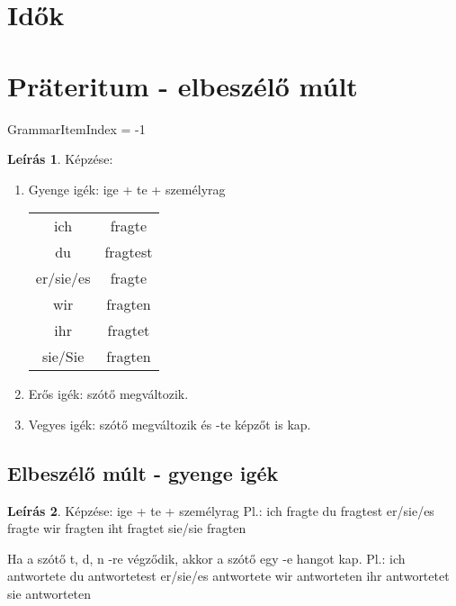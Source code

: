 \documentclass{article}
\theoremstyle{definition}
\newtheorem*{desc}{Leírás}
\begin{document}
\section{Idők}

\section{Präteritum - elbeszélő múlt}

GrammarItemIndex = -1

\begin{desc}
Képzése:
\begin{enumerate}
\item
Gyenge igék: ige + te + személyrag

\begin{tabular}{cc}
 ich & fragte \\
 du & fragtest \\
 er/sie/es & fragte \\
 wir & fragten \\
 ihr & fragtet \\
 sie/Sie & fragten
\end{tabular}

\item
Erős igék: szótő megváltozik.
\item
Vegyes igék: szótő megváltozik és -te képzőt is kap.
\end{enumerate}
\end{desc}

\subsection{Elbeszélő múlt - gyenge igék}

\begin{desc}
Képzése: ige + te + személyrag
Pl.:
ich fragte
du fragtest
er/sie/es fragte
wir fragten
iht fragtet
sie/sie fragten

Ha a szótő t, d, n -re végződik, akkor a szótő egy -e hangot kap.
Pl.:
ich	antwortete
du	antwortetest
er/sie/es	antwortete
wir	antworteten
ihr antwortetet
sie	antworteten
\end{desc}
\end{document}
